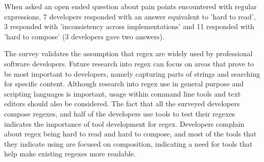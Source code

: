 When asked an open ended question about pain points encountered with regular expressions, 7 developers responded with an answer equivalent to 'hard to read', 3 responded with 'inconsistency across implementations' and 11 responded with 'hard to compose' (3 developers gave two answers).

The survey validates the assumption that regex are widely used by professional software developers.  Future research into regex can focus on areas that prove to be most important to developers, namely capturing parts of strings and searching for specific content.  Although research into regex use in general purpose and scripting languages is important, usage within command line tools and text editors should also be considered.  The fact that all the surveyed developers compose regexes, and half of the developers use tools to test their regexes indicates the importance of tool development for regex.  Developers complain about regex being hard to read and hard to compose, and most of the tools that they indicate using are focused on composition, indicating a need for tools that help make existing regexes more readable.
